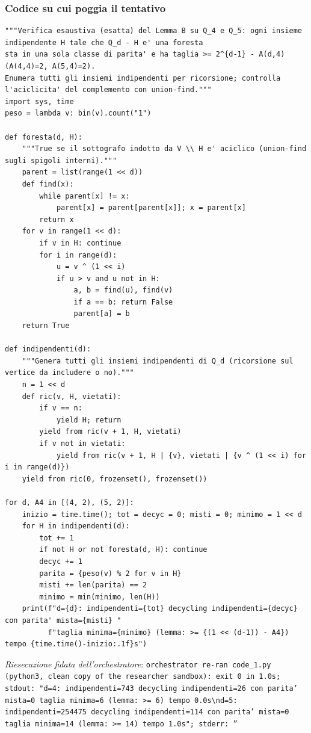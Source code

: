 \documentclass[11pt,a4paper]{article}
\begin{document}
\subsubsection{Codice su cui poggia il tentativo}
\begin{lstlisting}[caption={attempt\_001 code\_1 [python, rigore exact] — Exhaustive exact check of Theorem B on Q\_4 and Q\_5: enumerates all independent sets, keeps — verdetto del Referee: REJECT}]
"""Verifica esaustiva (esatta) del Lemma B su Q_4 e Q_5: ogni insieme indipendente H tale che Q_d - H e' una foresta
sta in una sola classe di parita' e ha taglia >= 2^{d-1} - A(d,4) (A(4,4)=2, A(5,4)=2).
Enumera tutti gli insiemi indipendenti per ricorsione; controlla l'aciclicita' del complemento con union-find."""
import sys, time
peso = lambda v: bin(v).count("1")

def foresta(d, H):
    """True se il sottografo indotto da V \\ H e' aciclico (union-find sugli spigoli interni)."""
    parent = list(range(1 << d))
    def find(x):
        while parent[x] != x:
            parent[x] = parent[parent[x]]; x = parent[x]
        return x
    for v in range(1 << d):
        if v in H: continue
        for i in range(d):
            u = v ^ (1 << i)
            if u > v and u not in H:
                a, b = find(u), find(v)
                if a == b: return False
                parent[a] = b
    return True

def indipendenti(d):
    """Genera tutti gli insiemi indipendenti di Q_d (ricorsione sul vertice da includere o no)."""
    n = 1 << d
    def ric(v, H, vietati):
        if v == n:
            yield H; return
        yield from ric(v + 1, H, vietati)
        if v not in vietati:
            yield from ric(v + 1, H | {v}, vietati | {v ^ (1 << i) for i in range(d)})
    yield from ric(0, frozenset(), frozenset())

for d, A4 in [(4, 2), (5, 2)]:
    inizio = time.time(); tot = decyc = 0; misti = 0; minimo = 1 << d
    for H in indipendenti(d):
        tot += 1
        if not H or not foresta(d, H): continue
        decyc += 1
        parita = {peso(v) % 2 for v in H}
        misti += len(parita) == 2
        minimo = min(minimo, len(H))
    print(f"d={d}: indipendenti={tot} decycling indipendenti={decyc} con parita' mista={misti} "
          f"taglia minima={minimo} (lemma: >= {(1 << (d-1)) - A4})  tempo {time.time()-inizio:.1f}s")

\end{lstlisting}
\noindent\emph{Riesecuzione fidata dell'orchestratore}: \texttt{orchestrator re-ran code\_1.py (python3, clean copy of the researcher sandbox): exit 0 in 1.0s; stdout: "d=4: indipendenti=743 decycling indipendenti=26 con parita' mista=0 taglia minima=6 (lemma: \textgreater{}= 6)  tempo 0.0s\textbackslash{}nd=5: indipendenti=254475 decycling indipendenti=114 con parita' mista=0 taglia minima=14 (lemma: \textgreater{}= 14)  tempo 1.0s"; stderr: ''}
\end{document}
